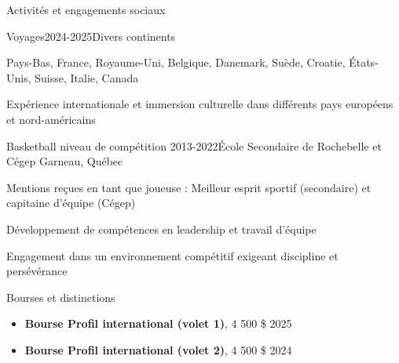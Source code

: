 \documentclass{resume} %
\begin{document}
\begin{rSection}{Activités et engagements sociaux}

\begin{rSubsection}{Voyages}{2024-2025}{Divers continents}{}              
\item Pays-Bas, France, Royaume-Uni, Belgique, Danemark, Suède, Croatie, États-Unis, Suisse, Italie, Canada
\item Expérience internationale et immersion culturelle dans différents pays européens et nord-américains
\end{rSubsection}  


\begin{rSubsection}{Basketball niveau de compétition} {2013-2022}{École Secondaire de Rochebelle et Cégep Garneau, Québec}{} 
\item Mentions reçues en tant que joueuse : Meilleur esprit sportif (secondaire) et capitaine d'équipe (Cégep)            
\item Développement de compétences en leadership et travail d'équipe
\item Engagement dans un environnement compétitif exigeant discipline et persévérance     
\end{rSubsection}

\end{rSection}
  


\begin{rSection}{Bourses et distinctions} \itemsep -2pt   

\begin{itemize}
 
\item \textbf{Bourse Profil international (volet 1)}, 4 500 \$ \hfill 2025 
\item \textbf{Bourse Profil international (volet 2)}, 4 500 \$ \hfill 2024

\end{itemize}  

\end{rSection} 
\end{document}
